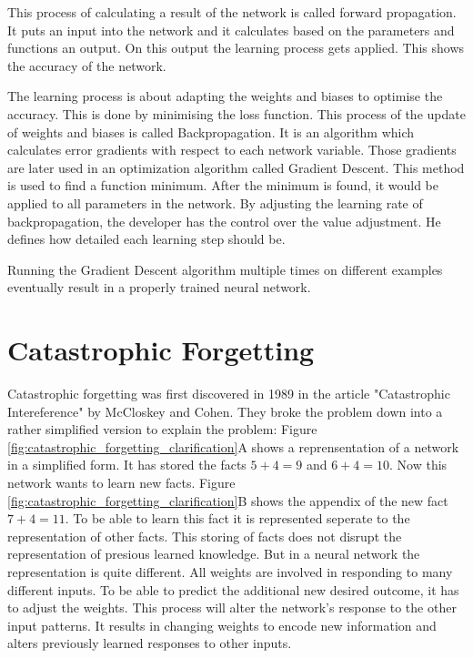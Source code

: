 This process of calculating a result of the network is called forward propagation.
It puts an input into the network and it calculates based on the parameters and functions an output.
On this output the learning process gets applied.
This shows the accuracy of the network.
\cite{math_nn_skalski, medium_nn_from_scratch}

The learning process is about adapting the weights and biases to
optimise the accuracy.
This is done by minimising the loss function.
This process of the update of weights and biases is called Backpropagation.
It is an algorithm which calculates error gradients with respect to each network variable.
Those gradients are later used in an optimization algorithm called Gradient Descent.
This method is used to find a function minimum.
After the minimum is found, it would be applied to all parameters in the network.
By adjusting the learning rate of backpropagation, the developer has the control over the value adjustment.
He defines how detailed each learning step should be.
\cite{math_nn_andrey}

Running the Gradient Descent algorithm multiple times on different examples eventually result in a properly trained neural network.

\section{Catastrophic Forgetting}

Catastrophic forgetting was first discovered in 1989 in the article "Catastrophic Intereference" by McCloskey and Cohen.
They broke the problem down into a rather simplified version to explain the problem:
Figure \ref{fig:catastrophic_forgetting_clarification}A shows a reprensentation of a network in a simplified form.
It has stored the facts $5 + 4 = 9$ and $6 + 4 = 10$.
\hfill \break
Now this network wants to learn new facts.
Figure \ref{fig:catastrophic_forgetting_clarification}B shows the appendix of the new fact $7 + 4 = 11$.
To be able to learn this fact it is represented seperate to the representation of other facts.
This storing of facts does not disrupt the representation of presious learned knowledge.
\hfill \break
But in a neural network the representation is quite different.
All weights are involved in responding to many different inputs.
To be able to predict the additional new desired outcome, it has to adjust the weights.
This process will alter the network's response to the other input patterns.
It results in changing weights to encode new information and alters previously learned responses to other inputs.
\cite{psychology_learning_mccloskey_cohen}

